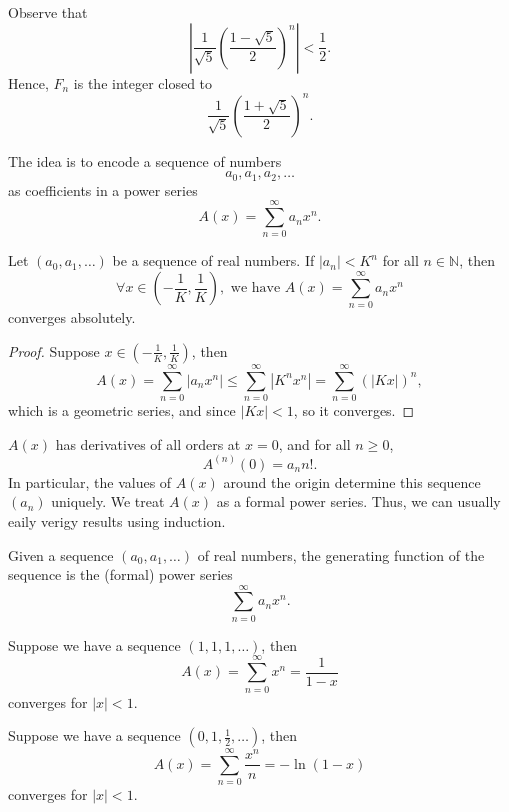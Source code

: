 Observe that 
\[
    \left\vert \frac{1}{\sqrt{5} } \left( \frac{1 - \sqrt{5} }{2} \right)^n  \right\vert < \frac{1}{2} .
\]
Hence, \(F_n\) is the integer closed to 
\[
    \frac{1}{\sqrt{5} } \left( \frac{1 + \sqrt{5} }{2} \right)^n. 
\] 

The idea is to encode a sequence of numbers 
\[
    a_0, a_1, a_2, \dots 
\]
as coefficients in a power series 
\[
    A(x) = \sum_{n=0}^{\infty} a_n x^n. 
\]

\begin{proposition}
    Let \((a_0, a_1, \dots )\) be a sequence of real numbers. If \(\vert a_n \vert < K^n \) for all \(n \in \mathbb{N} \), then
    \[
        \forall x \in \left( -\frac{1}{K}, \frac{1}{K} \right), \text{ we have } A(x) = \sum_{n=0}^{\infty} a_n x^n  
    \]  converges absolutely.
\end{proposition}
\begin{proof}
    Suppose \(x \in \left( -\frac{1}{K}, \frac{1}{K} \right) \), then 
    \[
        A(x) = \sum_{n=0}^{\infty} \left\vert a_n x^n \right\vert \le \sum_{n=0}^{\infty} \left\vert K^n x^n \right\vert = \sum_{n=0}^{\infty} \left( \left\vert Kx \right\vert  \right)^n,     
    \] which is a geometric series, and since \(\left\vert Kx \right\vert < 1 \), so it converges. 
\end{proof}

\(A(x)\) has derivatives of all orders at \(x = 0\), and for all \(n \ge 0\), 
    \[
        A^{(n)}(0) = a_n n!.
    \]  In particular, the values of \(A(x)\) around the origin determine this sequence \((a_n)\) uniquely. We treat \(A(x)\) as a formal power series.  Thus, we can usually eaily verigy results using induction. 

\begin{definition}
    Given a sequence \((a_0, a_1, \dots )\) of real numbers, the generating function of the sequence is the (formal) power series 
    \[
        \sum_{n=0}^{\infty} a_n x^n.  
    \]
\end{definition}

\begin{eg}
    Suppose we have a sequence \((1, 1, 1, \dots )\), then 
    \[
        A(x) = \sum_{n=0}^{\infty} x^n = \frac{1}{1-x} 
    \] converges for \(\vert x \vert < 1 \).  
\end{eg}

\begin{eg}
    Suppose we have a sequence \(\left( 0, 1, \frac{1}{2}, \dots  \right) \), then 
    \[
        A(x) = \sum_{n=0}^{\infty} \frac{x^n}{n} = -\ln (1 - x) 
    \] converges for \(\vert x \vert < 1 \).  
\end{eg}

